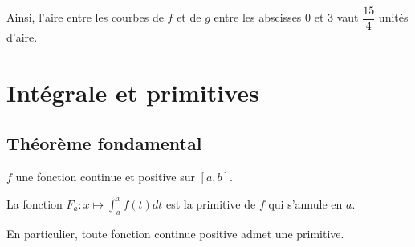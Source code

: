 \documentclass[11pt,fleqn, openany]{book} %
\begin{document}
\begin{example}
\begin{minipage}{0.25\linewidth}
\end{minipage}

Ainsi, l'aire entre les courbes de $f$ et de $g$ entre les abscisses 0 et 3 vaut $\dfrac{15}{4}$ unités d'aire.

\end{example}
\newpage
\section{Intégrale et primitives}
\subsection{Théorème fondamental}

\begin{theorem}
 $f$ une fonction continue et positive sur $[a,b]$. 
 
La fonction $F_a:x\mapsto \displaystyle\int_{a}^x f(t)dt$ est la primitive de $f$ qui s'annule en $a$.

En particulier, toute fonction continue positive admet une primitive.\end{theorem}
\end{document}
